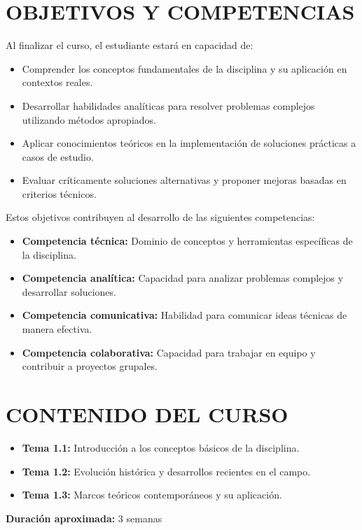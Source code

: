 \documentclass[12pt,a4paper]{article}
\begin{document}
\section{OBJETIVOS Y COMPETENCIAS}

\begin{objetivos}
Al finalizar el curso, el estudiante estará en capacidad de:
\begin{itemize}[leftmargin=*]
    \item Comprender los conceptos fundamentales de la disciplina y su aplicación en contextos reales.
    \item Desarrollar habilidades analíticas para resolver problemas complejos utilizando métodos apropiados.
    \item Aplicar conocimientos teóricos en la implementación de soluciones prácticas a casos de estudio.
    \item Evaluar críticamente soluciones alternativas y proponer mejoras basadas en criterios técnicos.
\end{itemize}
\end{objetivos}

\begin{competencias}
Estos objetivos contribuyen al desarrollo de las siguientes competencias:
\begin{itemize}[leftmargin=*]
    \item \textbf{Competencia técnica:} Dominio de conceptos y herramientas específicas de la disciplina.
    \item \textbf{Competencia analítica:} Capacidad para analizar problemas complejos y desarrollar soluciones.
    \item \textbf{Competencia comunicativa:} Habilidad para comunicar ideas técnicas de manera efectiva.
    \item \textbf{Competencia colaborativa:} Capacidad para trabajar en equipo y contribuir a proyectos grupales.
\end{itemize}
\end{competencias}
\vspace{0.5cm}

\section{CONTENIDO DEL CURSO}

\begin{tcolorbox}[colback=white,colframe=pucpAzul,title=\textbf{UNIDAD 1: Fundamentos Teóricos}]
\begin{itemize}[leftmargin=*]
    \item \textbf{Tema 1.1:} Introducción a los conceptos básicos de la disciplina.
    \item \textbf{Tema 1.2:} Evolución histórica y desarrollos recientes en el campo.
    \item \textbf{Tema 1.3:} Marcos teóricos contemporáneos y su aplicación.
\end{itemize}
\textbf{Duración aproximada:} 3 semanas
\end{tcolorbox}
\end{document}
